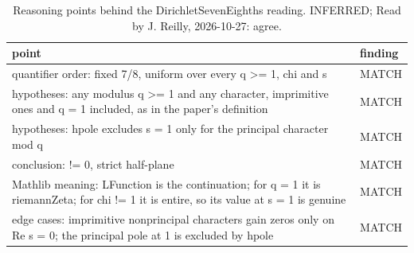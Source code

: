 \begin{table}[!htbp]
\caption{Reasoning points behind the DirichletSevenEighths reading. INFERRED; Read by J. Reilly, 2026-10-27: agree.}\label{tab:points-DirichletSevenEighths} %
\scriptsize\setlength{\tabcolsep}{3pt}\renewcommand{\arraystretch}{0.95}
\begin{tabularx}{\textwidth}{@{}>{\raggedright\arraybackslash}Xl@{}}
\toprule
point & finding \\ %
\midrule
quantifier order: fixed 7/8, uniform over every q >= 1, chi and s & MATCH \\ %
hypotheses: any modulus q >= 1 and any character, imprimitive ones and q = 1 included, as in the paper's definition & MATCH \\ %
hypotheses: hpole excludes s = 1 only for the principal character mod q & MATCH \\ %
conclusion: != 0, strict half-plane & MATCH \\ %
Mathlib meaning: LFunction is the continuation; for q = 1 it is riemannZeta; for chi != 1 it is entire, so its value at s = 1 is genuine & MATCH \\ %
edge cases: imprimitive nonprincipal characters gain zeros only on Re s = 0; the principal pole at 1 is excluded by hpole & MATCH \\ %
\bottomrule
\end{tabularx}
\end{table}


